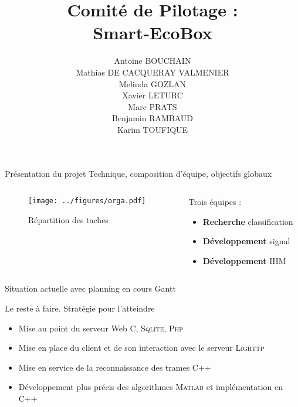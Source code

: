 \documentclass{beamer}
\title[Comité de Pilotage : Smart-EcoBox]{Comité de Pilotage :\\
Smart-EcoBox}
\author{Antoine BOUCHAIN \\
Mathias DE CACQUERAY VALMENIER \\
Melinda GOZLAN \\
Xavier LETURC \\
Marc PRATS \\
Benjamin RAMBAUD \\
Karim TOUFIQUE \\}
\institute{\textsc{ENSEIRB-MATMECA}}
\begin{document}
\begin{frame}
\titlepage
\end{frame}


\begin{frame}{Présentation du projet Technique, composition d’équipe, objectifs globaux}
   \begin{columns}[c]
  \begin{column}{8cm}
 \begin{figure}[h!]
 \centering
 	\texttt{[image: ../figures/orga.pdf]} 
 	\caption{Répartition des taches}
 	\label{figd3}
 \end{figure}
  \end{column}
  \begin{column}{3.7cm}
  \vspace{-50pt}
 \begin{exampleblock}{Trois équipes :} %
  \begin{itemize}
  \item \textbf{Recherche} classification
  \item \textbf{Développement} signal
  \item \textbf{Développement} IHM
  \end{itemize}
  \end{exampleblock}
  \end{column}
  \end{columns}
 \end{frame}

\begin{frame}[c]{Situation actuelle avec planning en cours}
Gantt
\end{frame}

\begin{frame}{Le reste à faire. Stratégie pour l’atteindre}
  \begin{itemize}
    \item Mise au point du serveur Web \textsc{C, Sqlite, Php}
    \item Mise en place du client et de son interaction avec le serveur \textsc{Lighttp}
    \item Mise en service de la reconnaissance des trames \textsc{C++}
    \item Développement plus précis des algorithmes \textsc{Matlab} et implémentation en \textsc{C++}
  \end{itemize}
\end{frame}
\end{document}

